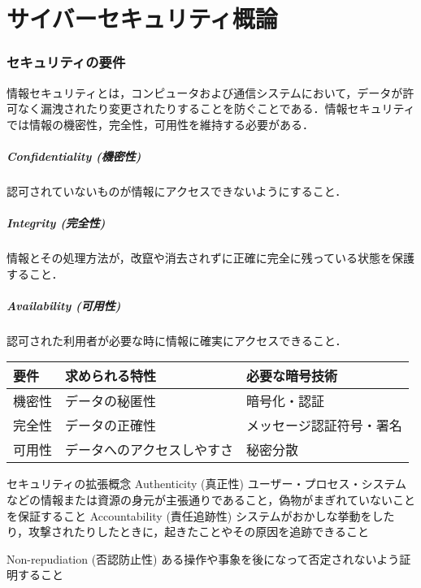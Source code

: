 \part{サイバーセキュリティ概論}
\section{セキュリティの要件}
情報セキュリティとは，コンピュータおよび通信システムにおいて，データが許可なく漏洩されたり変更されたりすることを防ぐことである．情報セキュリティでは情報の機密性，完全性，可用性を維持する必要がある．

\subsubsection{Confidentiality (機密性)}
認可されていないものが情報にアクセスできないようにすること．


\subsubsection{Integrity (完全性)}
情報とその処理方法が，改竄や消去されずに正確に完全に残っている状態を保護すること．
\subsubsection{Availability (可用性)}
認可された利用者が必要な時に情報に確実にアクセスできること．
\begin{table}[!ht]
    \centering
    \begin{tabular}{|l|l|l|}
    \hline
        要件 & 求められる特性 & 必要な暗号技術 \\ \hline
        機密性 & データの秘匿性 & 暗号化・認証 \\ \hline
        完全性 & データの正確性 & メッセージ認証符号・署名 \\ \hline
        可用性 & データへのアクセスしやすさ & 秘密分散 \\ \hline
    \end{tabular}
\end{table}

セキュリティの拡張概念
Authenticity (真正性)
ユーザー・プロセス・システムなどの情報または資源の身元が主張通りであること，偽物がまぎれていないことを保証すること
Accountability (責任追跡性)
システムがおかしな挙動をしたり，攻撃されたりしたときに，起きたことやその原因を追跡できること

Non-repudiation (否認防止性)
ある操作や事象を後になって否定されないよう証明すること

